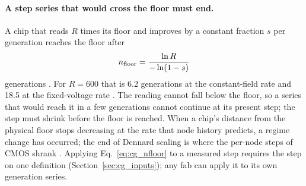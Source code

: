 \paragraph{A step series that would cross the floor must end.} A chip that reads $R$ times its floor and improves by a constant fraction $s$
per generation reaches the floor after
\begin{equation}
 n_{\rm floor}=\frac{\ln R}{-\ln(1-s)}
 \label{eq:cg_nfloor}
\end{equation}
generations \derived. For $R=600$ that is 6.2 generations at the constant-field rate and 18.5 at the fixed-voltage rate \calc. The reading
cannot fall below the floor, so a series that would reach it in a few generations cannot continue at its present step; the step must shrink
before the floor is reached. When a chip's distance from the physical floor stops decreasing at the rate that node history predicts, a regime
change has occurred; the end of Dennard scaling is where the per-node steps of CMOS shrank \interp. Applying Eq.~\eqref{eq:cg_nfloor} to a
measured step requires the step on one definition (Section~\ref{sec:cg_inputs}); any fab can apply it to its own generation series.

